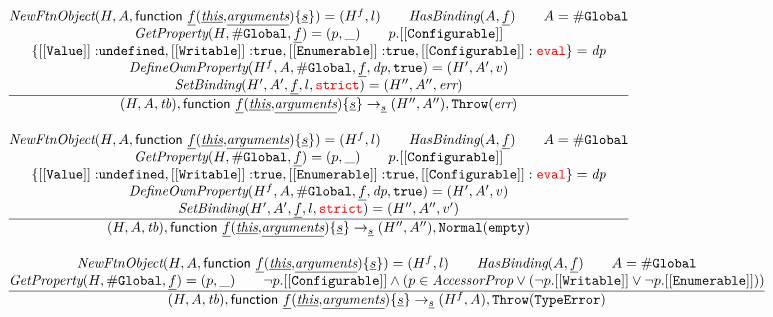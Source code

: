 \documentclass[a4paper, leqno]{amsart}
\newcommand{\rulesep}{\quad\quad}
\newcommand{\stmt}{s}
\newcommand{\ir}[1]{\ensuremath{\underline{#1}}}
\def\inred{\color{red}}
\newcommand{\strict}{{\inred\tt strict}}
\newcommand{\eval}{{\inred\tt eval}}
\newcommand{\undef}{{\tt undefined}}
\newcommand{\true}{{\tt true}}
\newcommand{\tb}{\emph{tb}}
\newcommand{\err}{\emph{err}}
\newcommand{\te}{{\tt TypeError}}
\renewcommand{\lg}{{\tt \#Global}}
\newcommand{\hf}[1]{\emph{#1}}
\newcommand{\void}{{\tt Normal}({\tt empty})}
\newcommand{\error}{\ensuremath{{\tt Throw}(\err)}}
\newcommand{\state}{\ensuremath{(H,A,\tb)}}
\newcommand{\respp}{\ensuremath{(H'',A'')}}
\newcommand{\irfndecl}{\ensuremath{{\sf function} \ \ir{f} {\tt(}\ir{\emph{this}}{\tt,}\ir{\emph{arguments}}{\tt) \{} \ir\stmt {\tt\}}}}
\def\inred{\color{red}}
\begin{document}
\[\begin{array}{l@{~~}l@{~~}ll}
\frac{\begin{matrix}
\hf{NewFtnObject}(H,A,\irfndecl) = (H^f, l)
\rulesep
\hf{HasBinding}(A, \ir{f})
\rulesep A = \lg\\
\hf{GetProperty}(H,\lg,\ir{f}) = (p, \_)
\rulesep
p.{\tt[[Configurable]]}
\\
\{{\tt [[Value]]:}\undef, {\tt [[Writable]]:}\true, {\tt [[Enumerable]]:}\true, {\tt [[Configurable]]:\eval}\} = \emph{dp}
\\
\hf{DefineOwnProperty}(H^f,A,\lg,\ir{f}, \emph{dp}, \true) = (H',A',v)\\
\hf{SetBinding}(H', A', \ir{f}, l, \strict) = (H'', A'', \err)
\end{matrix}}{\begin{matrix}
\state, \irfndecl \rightarrow_{\ir\stmt} \respp,\error
\end{matrix}}\\[2em]

\frac{\begin{matrix}
\hf{NewFtnObject}(H,A,\irfndecl) = (H^f, l)
\rulesep
\hf{HasBinding}(A, \ir{f})
\rulesep A = \lg\\
\hf{GetProperty}(H,\lg,\ir{f}) = (p, \_)
\rulesep
p.{\tt[[Configurable]]}
\\
\{{\tt [[Value]]:}\undef, {\tt [[Writable]]:}\true, {\tt [[Enumerable]]:}\true, {\tt [[Configurable]]:\eval}\} = \emph{dp}
\\
\hf{DefineOwnProperty}(H^f,A,\lg,\ir{f}, \emph{dp}, \true) = (H',A',v)\\
\hf{SetBinding}(H', A', \ir{f}, l, \strict) = (H'', A'', v')
\end{matrix}}{\begin{matrix}
\state, \irfndecl \rightarrow_{\ir\stmt} \respp,\void
\end{matrix}}\\[2em]


\frac{\begin{matrix}
\hf{NewFtnObject}(H,A,\irfndecl) = (H^f, l)
\rulesep
\hf{HasBinding}(A, \ir{f})
\rulesep A = \lg\\
\hf{GetProperty}(H,\lg,\ir{f}) = (p, \_)
\rulesep
\neg p.{\tt[[Configurable]]}
\wedge (p \in \emph{AccessorProp} \vee (\neg p.{\tt[[Writable]]} \vee \neg p.{\tt[[Enumerable]]}))
\end{matrix}}{\begin{matrix}
\state, \irfndecl \rightarrow_{\ir\stmt} (H^f,A), {\tt Throw}(\te)
\end{matrix}}\\[2em]


\end{array}\]
\end{document}
